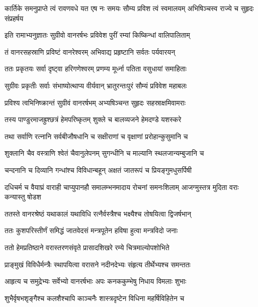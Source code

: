 \threelineshloka
{कार्तिके समनुप्राप्ते त्वं रावणवधे यत}
{एष नः समयः सौम्य प्रविश त्वं स्वमालयम्}
{अभिषिञ्चस्व राज्ये च सुहृदः संप्रहर्षय} %

\twolineshloka
{इति रामाभ्यनुज्ञातः सुग्रीवो वानरर्षभः}
{प्रविवेश पुरीं रम्यां किष्किन्धां वालिपालिताम्} %

\twolineshloka
{तं वानरसहस्राणि प्रविष्टं वानरेश्वरम्}
{अभिवाद्य प्रहृष्टानि सर्वतः पर्यवारयन्} %

\twolineshloka
{ततः प्रकृतयः सर्वा दृष्ट्वा हरिगणेश्वरम्}
{प्रणम्य मूर्ध्ना पतिता वसुधायां समाहिताः} %

\twolineshloka
{सुग्रीवः प्रकृतीः सर्वाः संभाष्योत्थाप्य वीर्यवान्}
{भ्रातुरन्तःपुरं सौम्यं प्रविवेश महाबलः} %

\twolineshloka
{प्रविश्य त्वभिनिष्क्रान्तं सुग्रीवं वानरर्षभम्}
{अभ्यषिञ्चन्त सुहृदः सहस्राक्षमिवामराः} %

\twolineshloka
{तस्य पाण्डुरमाजह्रुश्छत्रं हेमपरिष्कृतम्}
{शुक्ले च बालव्यजने हेमदण्डे यशस्करे} %

\twolineshloka
{तथा सर्वाणि रत्नानि सर्वबीजौषधानि च}
{सक्षीराणां च वृक्षाणां प्ररोहान्कुसुमानि च} %

\twolineshloka
{शुक्लानि चैव वस्त्राणि श्वेतं चैवानुलेपनम्}
{सुगन्धीनि च माल्यानि स्थलजान्यम्बुजानि च} %

\twolineshloka
{चन्दनानि च दिव्यानि गन्धांश्च विविधान्बहून्}
{अक्षतं जातरूपं च प्रियङ्गुमधुसर्पिषी} %

\threelineshloka
{दधिचर्म च वैयाघ्रं वाराही चाप्युपानहौ}
{समालम्भनमादाय रोचनां समनःशिलाम्}
{आजग्मुस्तत्र मुदिता वराः कन्यास्तु षोडश} %

\twolineshloka
{ततस्ते वानरश्रेष्ठं यथाकालं यथाविधि}
{रत्नैर्वस्त्रैश्च भक्ष्यैश्च तोषयित्वा द्विजर्षभान्} %

\twolineshloka
{ततः कुशपरिस्तीर्णं समिद्धं जातवेदसं}
{मन्त्रपूतेन हविषा हुत्वा मन्त्रविदो जनाः} %

\twolineshloka
{ततो हेमप्रतिष्ठाने वरास्तरणसंवृते}
{प्रासादशिखरे रम्ये चित्रमाल्योपशोभिते} %

\twolineshloka
{प्राङ्मुखं विविधैर्मन्त्रैः स्थापयित्वा वरासने}
{नदीनदेभ्यः संहृत्य तीर्थेभ्यश्च समन्ततः} %

\twolineshloka
{आहृत्य च समुद्रेभ्यः सर्वेभ्यो वानरर्षभाः}
{अपः कनककुम्भेषु निधाय विमलाः शुभाः} %

\twolineshloka
{शुभैर्वृषभशृङ्गैश्च कलशैश्चापि काञ्चनैः}
{शास्त्रदृष्टेन विधिना महर्षिविहितेन च} %

